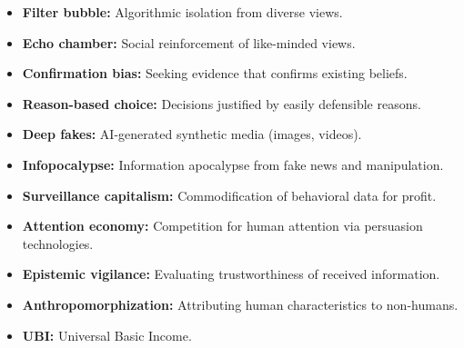 \begin{defbox}
\begin{itemize}
  \item \textbf{Filter bubble:} Algorithmic isolation from diverse views.
  \item \textbf{Echo chamber:} Social reinforcement of like-minded views.
  \item \textbf{Confirmation bias:} Seeking evidence that confirms existing beliefs.
  \item \textbf{Reason-based choice:} Decisions justified by easily defensible reasons.
  \item \textbf{Deep fakes:} AI-generated synthetic media (images, videos).
  \item \textbf{Infopocalypse:} Information apocalypse from fake news and manipulation.
  \item \textbf{Surveillance capitalism:} Commodification of behavioral data for profit.
  \item \textbf{Attention economy:} Competition for human attention via persuasion technologies.
  \item \textbf{Epistemic vigilance:} Evaluating trustworthiness of received information.
  \item \textbf{Anthropomorphization:} Attributing human characteristics to non-humans.
  \item \textbf{UBI:} Universal Basic Income.
\end{itemize}
\end{defbox}

